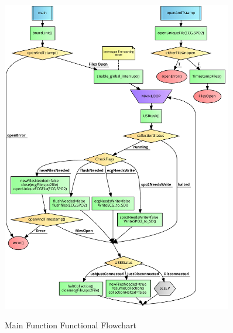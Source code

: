 \begin{figure}
	\begin{center}
		\label{fig:flowchart_main}
		\includegraphics[scale=1,width=0.9\textwidth]{Images/FlowChartMain.pdf} 
		\caption{Main Function Functional Flowchart}
	\end{center}
\end{figure}

